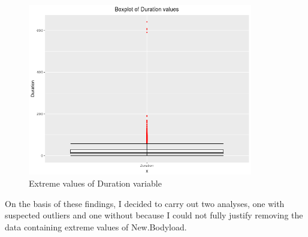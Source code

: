 \begin{figure}[h]
	\centering
	\includegraphics[width=0.6\linewidth, height=7.5cm]{Images/DurationOutliers.png}
	\caption{Extreme values of Duration variable}
\end{figure}

On the basis of these findings, I decided to carry out two analyses, one with suspected outliers and one without because I could not fully justify removing the data containing extreme values of New.Bodyload.


